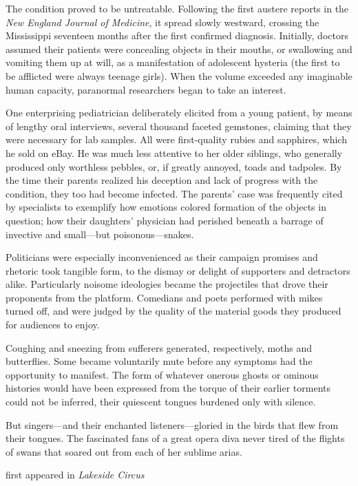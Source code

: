 The condition proved to be untreatable. Following the first austere
reports in the \emph{New England Journal of Medicine}, it spread slowly
westward, crossing the Mississippi seventeen months after the first
confirmed diagnosis. Initially, doctors assumed their patients were
concealing objects in their mouths, or swallowing and vomiting them up
at will, as a manifestation of adolescent hysteria (the first to be
afflicted were always teenage girls). When the volume exceeded any
imaginable human capacity, paranormal researchers began to take an
interest.

One enterprising pediatrician deliberately elicited from a young
patient, by means of lengthy oral interviews, several thousand faceted
gemstones, claiming that they were necessary for lab samples. All were
first-quality rubies and sapphires, which he sold on eBay. He was much
less attentive to her older siblings, who generally produced only
worthless pebbles, or, if greatly annoyed, toads and tadpoles. By the
time their parents realized his deception and lack of progress with the
condition, they too had become infected. The parents' case was
frequently cited by specialists to exemplify how emotions colored
formation of the objects in question; how their daughters' physician had
perished beneath a barrage of invective and small---but
poisonous---snakes.

Politicians were especially inconvenienced as their campaign promises
and rhetoric took tangible form, to the dismay or delight of supporters
and detractors alike. Particularly noisome ideologies became the
projectiles that drove their proponents from the platform. Comedians and
poets performed with mikes turned off, and were judged by the quality of
the material goods they produced for audiences to enjoy.

Coughing and sneezing from sufferers generated, respectively, moths and
butterflies. Some became voluntarily mute before any symptoms had the
opportunity to manifest. The form of whatever onerous ghosts or ominous
histories would have been expressed from the torque of their earlier
torments could not be inferred, their quiescent tongues burdened only
with silence.

But singers---and their enchanted listeners---gloried in the birds that
flew from their tongues. The fascinated fans of a great opera diva never
tired of the flights of swans that soared out from each of her sublime
arias.

first appeared in \emph{Lakeside Circus}
